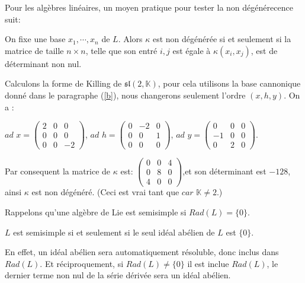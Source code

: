 \documentclass[a4paper,openany,12pt]{report}
\newcommand{\KK}{\mathbb{K}}
\newcommand{\ssl}{\mathfrak{sl}}
\theoremstyle{break}
{\theorembodyfont{\upshape}
\newtheorem*{rmq}{Remarque :}
\newtheorem*{prv}{Preuve :}
\newtheorem*{ex}{Exemples :}
\newtheorem*{exe}{Exemple : }
\newtheorem*{nota}{Notation :}
\newtheorem*{dem}{D\'emonstration :}}
\begin{document}
Pour les algèbres linéaires, un moyen pratique pour tester la non dégénérecence suit: 

On fixe une base $x_1, \cdots, x_n$ de $L$. Alors $\kappa$ est non dégénérée si et seulement si la matrice de taille $n \times n$, telle que son entré $i,j$ est égale à $\kappa(x_i,x_j)$, est de déterminant non nul. 

\begin{exe}
\quad Calculons la forme de Killing de $\ssl(2,\KK)$, pour cela utilisons la base cannonique donné dans le paragraphe (\ref{b}), nous changerons seulement l'ordre $(x,h,y)$. On a :
\begin{center}
$ad$ $x = \begin{pmatrix} 2 & 0 & 0 \\ 0 & 0 & 0 \\ 0 & 0 & -2 \end{pmatrix}$,
$ad$ $h = \begin{pmatrix} 0 & -2 & 0 \\ 0 & 0 & 1 \\ 0 & 0 & 0 \end{pmatrix}$,
$ad$ $y = \begin{pmatrix} 0 & 0 & 0 \\ -1 & 0 & 0 \\ 0 & 2 & 0 \end{pmatrix}$.
\end{center} 

Par consequent la matrice de $\kappa$ est: 
$\begin{pmatrix} 
0 & 0 & 4 \\
0 & 8 & 0 \\
4 & 0 & 0
\end{pmatrix}$,et son déterminant est $-128$, ainsi $\kappa$ est non dégénéré. (Ceci est vrai tant que $car$ $\KK \neq 2$.)
\end{exe}

Rappelons qu'une algèbre de Lie est semisimple si $Rad(L)= \{0\}$. 

\begin{prop}
\quad $L$ est semisimple si et seulement si le seul idéal abélien de $L$ est $\{0\}$.
\end{prop}

\begin{prv}
\quad En effet, un idéal abélien sera automatiquement résoluble, donc inclus dans $Rad(L)$. Et réciproquement, si $Rad(L) \neq \{0\}$ il est inclue $Rad(L)$, le dernier terme non nul de la série dérivée sera un idéal abélien.
\end{prv}
\end{document}
